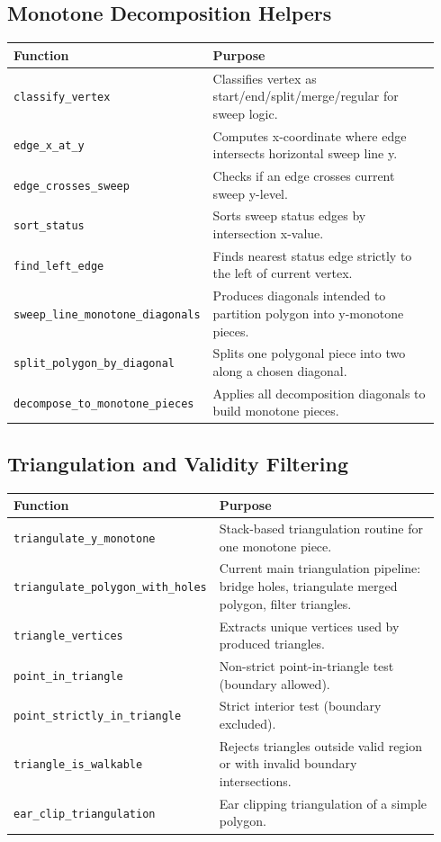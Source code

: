 \documentclass[11pt]{article}
\begin{document}
\subsection{Monotone Decomposition Helpers}
\begin{longtable}{p{0.28\linewidth}p{0.66\linewidth}}
\toprule
Function & Purpose \\
\midrule
\texttt{classify\_vertex} & Classifies vertex as start/end/split/merge/regular for sweep logic. \\
\texttt{edge\_x\_at\_y} & Computes x-coordinate where edge intersects horizontal sweep line y. \\
\texttt{edge\_crosses\_sweep} & Checks if an edge crosses current sweep y-level. \\
\texttt{sort\_status} & Sorts sweep status edges by intersection x-value. \\
\texttt{find\_left\_edge} & Finds nearest status edge strictly to the left of current vertex. \\
\texttt{sweep\_line\_monotone\_diagonals} & Produces diagonals intended to partition polygon into y-monotone pieces. \\
\texttt{split\_polygon\_by\_diagonal} & Splits one polygonal piece into two along a chosen diagonal. \\
\texttt{decompose\_to\_monotone\_pieces} & Applies all decomposition diagonals to build monotone pieces. \\
\bottomrule
\end{longtable}

\subsection{Triangulation and Validity Filtering}
\begin{longtable}{p{0.28\linewidth}p{0.66\linewidth}}
\toprule
Function & Purpose \\
\midrule
\texttt{triangulate\_y\_monotone} & Stack-based triangulation routine for one monotone piece. \\
\texttt{triangulate\_polygon\_with\_holes} & Current main triangulation pipeline: bridge holes, triangulate merged polygon, filter triangles. \\
\texttt{triangle\_vertices} & Extracts unique vertices used by produced triangles. \\
\texttt{point\_in\_triangle} & Non-strict point-in-triangle test (boundary allowed). \\
\texttt{point\_strictly\_in\_triangle} & Strict interior test (boundary excluded). \\
\texttt{triangle\_is\_walkable} & Rejects triangles outside valid region or with invalid boundary intersections. \\
\texttt{ear\_clip\_triangulation} & Ear clipping triangulation of a simple polygon. \\
\bottomrule
\end{longtable}
\end{document}
